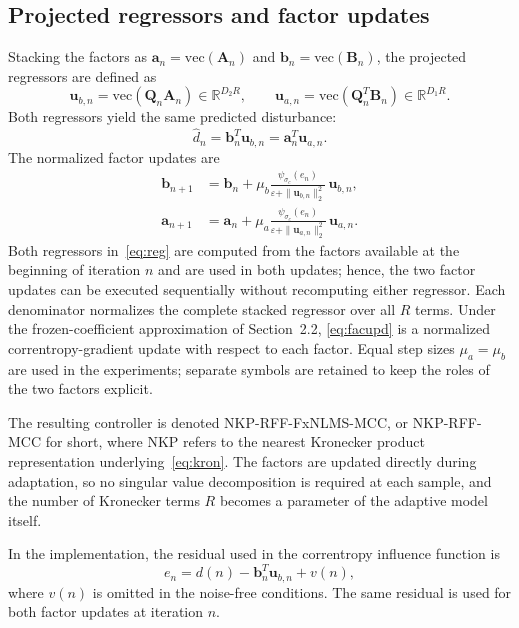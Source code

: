 \documentclass[preprint,12pt]{elsarticle}
\begin{document}
\subsection{Projected regressors and factor updates}

Stacking the factors as $\mathbf{a}_n = \mathrm{vec}(\mathbf{A}_n)$ and $\mathbf{b}_n = \mathrm{vec}(\mathbf{B}_n)$, the projected regressors are defined as
\begin{equation}\label{eq:reg}
\mathbf{u}_{b,n} = \mathrm{vec}(\mathbf{Q}_n \mathbf{A}_n) \in \mathbb{R}^{D_2 R}, \qquad
\mathbf{u}_{a,n} = \mathrm{vec}(\mathbf{Q}_n^T \mathbf{B}_n) \in \mathbb{R}^{D_1 R}.
\end{equation}
Both regressors yield the same predicted disturbance:
\begin{equation}
\widehat{d}_n = \mathbf{b}_n^T \mathbf{u}_{b,n} = \mathbf{a}_n^T \mathbf{u}_{a,n}.
\end{equation}
The normalized factor updates are
\begin{equation}\label{eq:facupd}
\begin{aligned}
\mathbf{b}_{n+1} &= \mathbf{b}_n + \mu_b \frac{\psi_{\sigma_c}(e_n)}{\varepsilon + \|\mathbf{u}_{b,n}\|_2^2}\, \mathbf{u}_{b,n}, \\
\mathbf{a}_{n+1} &= \mathbf{a}_n + \mu_a \frac{\psi_{\sigma_c}(e_n)}{\varepsilon + \|\mathbf{u}_{a,n}\|_2^2}\, \mathbf{u}_{a,n}.
\end{aligned}
\end{equation}
Both regressors in~\eqref{eq:reg} are computed from the factors available at the beginning of iteration $n$ and are used in both updates; hence, the two factor updates can be executed sequentially without recomputing either regressor. Each denominator normalizes the complete stacked regressor over all $R$ terms. Under the frozen-coefficient approximation of Section~2.2, \eqref{eq:facupd} is a normalized correntropy-gradient update with respect to each factor. Equal step sizes $\mu_a = \mu_b$ are used in the experiments; separate symbols are retained to keep the roles of the two factors explicit.

The resulting controller is denoted NKP-RFF-FxNLMS-MCC, or NKP-RFF-MCC for short, where NKP refers to the nearest Kronecker product representation underlying~\eqref{eq:kron}. The factors are updated directly during adaptation, so no singular value decomposition is required at each sample, and the number of Kronecker terms $R$ becomes a parameter of the adaptive model itself.

In the implementation, the residual used in the correntropy influence function is
\begin{equation}\label{eq:res}
e_n = d(n) - \mathbf{b}_n^T \mathbf{u}_{b,n} + v(n),
\end{equation}
where $v(n)$ is omitted in the noise-free conditions. The same residual is used for both factor updates at iteration $n$.
\end{document}
